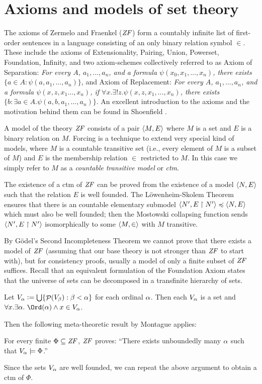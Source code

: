 \section{Axioms and models of set theory}

The axioms of Zermelo and Fraenkel ($\mathit{ZF}$) form a
countably infinite list of first-order sentences in a language
consisting of an only binary relation symbol $\in$. These include the
axioms of Extensionality, Pairing, Union, Powerset, Foundation, Infinity, and two
axiom-schemes collectively referred to as Axiom of Separation:
\emph{For every $A$, $a_1,\dots,a_n$,  and  a formula
  $\psi(x_0,x_1,\dots,x_n)$, there exists $\{a\in  A:
  \psi(a,a_1,\dots,a_n)\}$}, 
and Axiom of Replacement: \emph{For every $A$, $a_1,\dots,a_n$,  and
  a formula   $\psi(x,z,x_1\dots,x_n)$, if 
  $\forall x.\exists!z.\psi(x,z,x_1,\dots,x_n)$,  there exists 
  $\{b : \exists a\in A. \psi(a,b,a_1,\dots,a_n)\}$}.
An excellent introduction to the axioms and the motivation behind them
can be found in Shoenfield \cite{MR3727410}. 

A model of the theory $\mathit{ZF}$ consists of a pair $\langle M,E\rangle$ where $M$
is a set and $E$ is a binary relation on $M$. Forcing is a technique
to extend very special kind of models, where $M$ is a countable
transitive set (i.e., every element of $M$ is a subset of $M$) and
$E$ is the membership relation $\in$ restricted to $M$. In this case
we simply refer to $M$ as a \emph{countable transitive model} or
\emph{ctm}.

The existence of a ctm of $\mathit{ZF}$ can be proved from the existence of a
model  $\langle N,E\rangle$ such that the relation $E$ is well founded. The
L\"owenheim-Skolem 
Theorem ensures that there is an countable elementary submodel 
$\langle N',E\upharpoonright N'\rangle\preccurlyeq  \langle N,E\rangle$ which must also be
well founded; then the 
Mostowski collapsing function \cite[Def.~I.9.31]{kunen2011set} sends $\langle
N',E\upharpoonright N'\rangle$ 
isomorphically to some $\langle M,\in\rangle$ with  $M$ transitive.

By G\"odel's Second Incompleteness Theorem we cannot  prove that
there exists a model of $\mathit{ZF}$  (assuming that our base theory is not
stronger than $\mathit{ZF}$ to start with), but for consistency proofs,
usually a model of only a finite subset of $\mathit{ZF}$ suffices. Recall that
an equivalent formulation of the Foundation Axiom states that the 
universe of sets can be decomposed in a transfinite hierarchy of
sets. 
\begin{theorem}
  Let $V_{\alpha}\mathrel{\mathop:}=\mathop{\textstyle\bigcup}\{\mathop{\mathcal{P}}(V_\beta) : \beta<\alpha\}$ for each ordinal
  $\alpha$. Then each $V_\alpha$ is a set and 
  $\forall x. \exists\al .\ \Ord(\al) \y x\in V_\al$.  
\end{theorem}
%
Then the following meta-theoretic result by Montague applies:
%
\begin{theorem}\label{th:reflection-principle}
  For every finite $\Phi\subseteq\mathit{ZF}$, $\mathit{ZF}$ proves: ``There exists
    unboundedly many $\alpha$ such that $V_\alpha\models \Phi$.''
\end{theorem}
%
Since the sets $V_\alpha$ are well founded, we can repeat the above
argument to obtain a ctm of $\Phi$.


